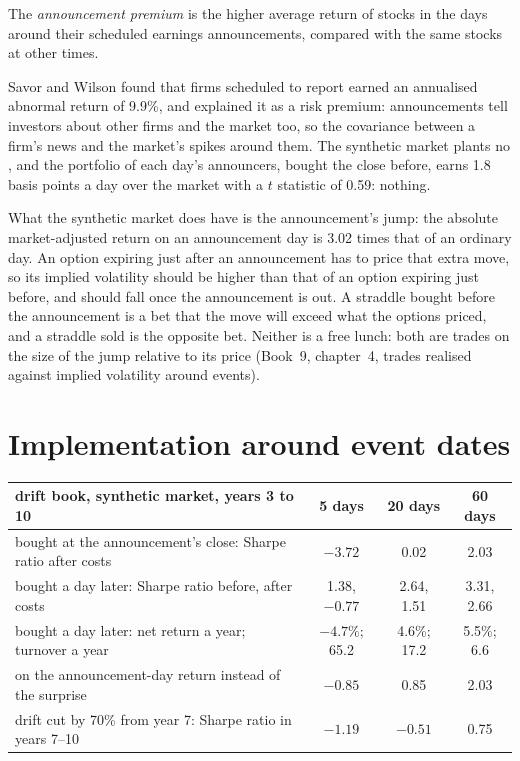 \begin{definition}\label{def:s1:earnings:premium}
The \emph{announcement premium} is the higher average return of stocks in the days around their scheduled earnings
announcements, compared with the same stocks at other times.
\end{definition}

Savor and Wilson found that firms scheduled to report earned an annualised abnormal return of 9.9\%, and explained it as a risk premium: announcements
tell investors about other firms and the market too, so the covariance between a firm's news and the market's spikes around them. The synthetic market
plants no , and the portfolio of each day's announcers, bought the close before, earns 1.8 basis points a day over the market with a
$t$ statistic of 0.59: nothing.

What the synthetic market does have is the announcement's jump: the absolute market-adjusted return on an announcement day is 3.02 times that of an
ordinary day. An option expiring just after an announcement has to price that extra move, so its implied volatility should be higher than that of an
option expiring just before, and should fall once the announcement is out. A straddle bought before the announcement is a bet that the move will exceed what the options priced, and a straddle sold is
the opposite bet. Neither is a free lunch: both are trades on the size of the jump relative to its price (Book~9, chapter~4, trades realised against implied volatility around events).

\section{Implementation around event dates}

\begin{center}
\small
\begin{tabular}{@{}lccc@{}}
\toprule
drift book, synthetic market, years 3 to 10 & 5 days & 20 days & 60 days\\
\midrule
bought at the announcement's close: Sharpe ratio after costs & $-3.72$ & 0.02 & 2.03\\
bought a day later: Sharpe ratio before, after costs & 1.38, $-0.77$ & 2.64, 1.51 & 3.31, 2.66\\
bought a day later: net return a year; turnover a year & $-4.7\%$; 65.2 & 4.6\%; 17.2 & 5.5\%; 6.6\\
on the announcement-day return instead of the surprise & $-0.85$ & 0.85 & 2.03\\
drift cut by 70\% from year 7: Sharpe ratio in years 7--10 & $-1.19$ & $-0.51$ & 0.75\\
\bottomrule
\end{tabular}
\end{center}

